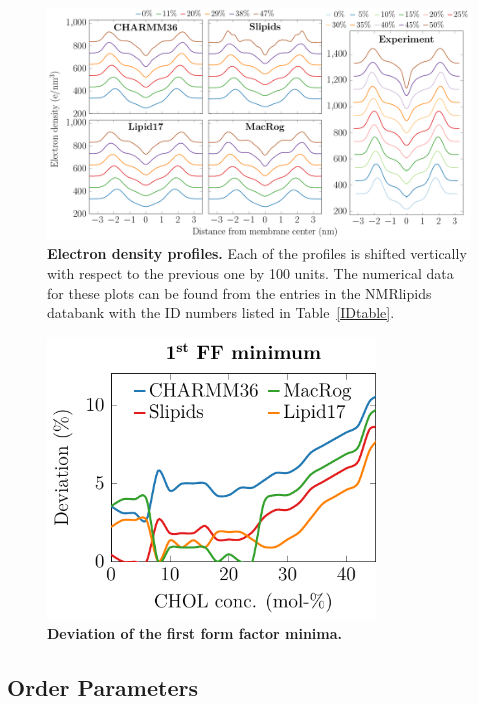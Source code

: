 \documentclass[journal=jpcbfk,manuscript=suppinfo]{achemso}
\begin{document}
\begin{figure}[htb!]
    \centering
    \includegraphics[width=\linewidth]{../FIGS/densityprofiles.pdf}
    \caption{\label{SIfig:densprofs}%
    \textbf{Electron density profiles.}
    Each of the profiles is shifted vertically with respect to the previous one by 100 units. The numerical data for these plots can be found from the entries in the NMRlipids databank with the ID numbers listed in Table~\ref{IDtable}.
    }
\end{figure}

\begin{figure}[htb!]
    \centering
    \includegraphics[width=8.7cm]{../FIGS/firstminima.pdf}
    \caption{\label{SIfig:firstminima}%
     \textbf{Deviation of the first form factor minima.} 
    }
\end{figure}

\clearpage
\subsection{Order Parameters}
\end{document}
